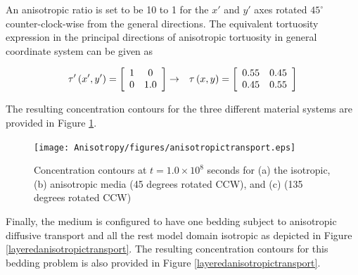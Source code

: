 An anisotropic ratio is set to be 10 to 1 for the $x'$ and $y'$ axes rotated $45^ \circ  $ counter-clock-wise from the general directions. The equivalent tortuosity expression in the principal directions of anisotropic tortuosity in general coordinate system can be given as

\begin{eqnarray}
\tau '\left( {x',y'} \right) = \left[ {\begin{array}{*{20}c}
   1 & 0  \\
   0 & {1.0}  \\
\end{array}} \right] &  \to  & \tau \left( {x,y} \right) = \left[ {\begin{array}{*{20}c}
   {0.55} & {0.45}  \\
   {0.45} & {0.55}  \\
\end{array}} \right]
\end{eqnarray}

The resulting concentration contours for the three different material systems are provided in Figure \ref{anisotropictransport}.

\begin{figure}[H]
\centering
\texttt{[image: Anisotropy/figures/anisotropictransport.eps]}
\caption{Concentration contours at $t = 1.0 \times 10^8 $ seconds for (a) the isotropic, (b) anisotropic media (45 degrees rotated CCW), and (c) (135 degrees rotated CCW)}
\label{anisotropictransport}
\end{figure}

Finally, the medium is configured to have one bedding subject to anisotropic diffusive transport and all the rest model domain isotropic as depicted in Figure \ref{layeredanisotropictransport}. The resulting concentration contours for this bedding problem is also provided in Figure \ref{layeredanisotropictransport}.

